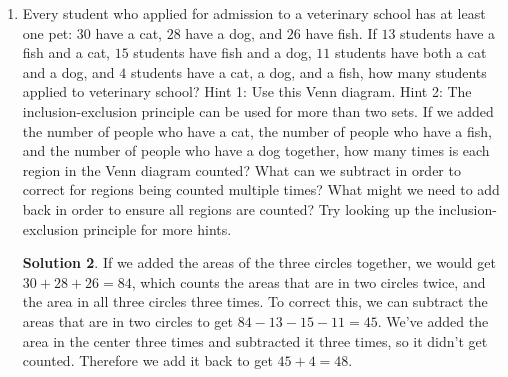 \documentclass{article}
\theoremstyle{definition}
\newtheorem*{solution}{Solution}
\begin{document}
\begin{enumerate}
\begin{solution}
            Another way to do this would be to recognize that a rectangle can be 
            defined by the position of its four sides. There are three ways to 
            choose two of the three horizontal lines to be the top and bottom of 
            the rectangle, and there are six ways to choose two of the four 
            vertical lines to be the sides of the rectangle, so there are $3 
            \cdot 6 = 18$ rectangles.
        \end{solution}
    \item Every student who applied for admission to a veterinary school has at 
        least one pet: $30$ have a cat, $28$ have a dog, and $26$ have fish. If 
        $13$ students have a fish and a cat, $15$ students have fish and a dog, 
        $11$ students have both a cat and a dog, and $4$ students have a cat, a 
        dog, and a fish, how many students applied to veterinary school? Hint 1: 
        Use this Venn diagram. Hint 2: The inclusion-exclusion principle can be 
        used for more than two sets. If we added the number of people who have a 
        cat, the number of people who have a fish, and the number of people who 
        have a dog together, how many times is each region in the Venn diagram 
        counted? What can we subtract in order to correct for regions being 
        counted multiple times? What might we need to add back in order to 
        ensure all regions are counted? Try looking up the inclusion-exclusion 
        principle for more hints.
        \begin{center}
        \end{center}
        \begin{solution}
            If we added the areas of the three circles together, we would get 
            $30 + 28 + 26 = 84$, which counts the areas that are in two circles 
            twice, and the area in all three circles three times. To correct 
            this, we can subtract the areas that are in two circles to get $84 - 
            13 - 15 - 11 = 45$. We've added the area in the center three times 
            and subtracted it three times, so it didn't get counted. Therefore 
            we add it back to get $45 + 4 = 48$.
        \end{solution}
\end{enumerate}
\end{document}
